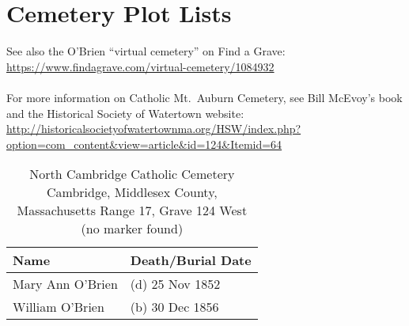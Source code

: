 \section{Cemetery Plot Lists}

\setlength{\parindent}{0cm}

See also the O'Brien ``virtual cemetery'' on Find a Grave: \url{https://www.findagrave.com/virtual-cemetery/1084932}\\
\\
For more information on Catholic Mt.\ Auburn Cemetery, see Bill McEvoy's book and the Historical Society of Watertown website: \url{http://historicalsocietyofwatertownma.org/HSW/index.php?option=com_content&view=article&id=124&Itemid=64}

\begin{table}[ht]
	\centering
		\caption{North Cambridge Catholic Cemetery\cite{DianaBerberenaLetter1} \\
		Cambridge, Middlesex County, Massachusetts
		Range 17, Grave 124 West (no marker found)}
	\begin{tabular}{|l|l|}
		\hline
		\textbf{Name} & \textbf{Death/Burial Date} \\
		\hline
	Mary Ann O'Brien\index{O'Brien!Mary Ann\textsuperscript{3} (1852--1852)} & (d) 25 Nov 1852 \\
	\hline
	William O'Brien\index{O'Brien!William\textsuperscript{1}} & (b) 30 Dec 1856 \\
	\hline
	\end{tabular}
\end{table}

